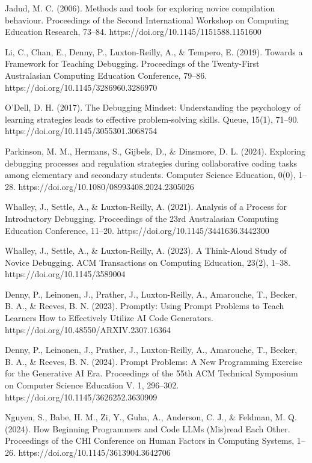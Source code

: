 \documentclass[12pt]{extarticle}
\begin{document}
\newpage
\begin{thebibliography}{9}

Jadud, M. C. (2006). Methods and tools for exploring novice compilation behaviour. Proceedings of the Second International Workshop on Computing Education Research, 73–84. https://doi.org/10.1145/1151588.1151600

Li, C., Chan, E., Denny, P., Luxton-Reilly, A., \& Tempero, E. (2019). Towards a Framework for Teaching Debugging. Proceedings of the Twenty-First Australasian Computing Education Conference, 79–86. https://doi.org/10.1145/3286960.3286970

O’Dell, D. H. (2017). The Debugging Mindset: Understanding the psychology of learning strategies leads to effective problem-solving skills. Queue, 15(1), 71–90. https://doi.org/10.1145/3055301.3068754

Parkinson, M. M., Hermans, S., Gijbels, D., \& Dinsmore, D. L. (2024). Exploring debugging processes and regulation strategies during collaborative coding tasks among elementary and secondary students. Computer Science Education, 0(0), 1–28. https://doi.org/10.1080/08993408.2024.2305026

Whalley, J., Settle, A., \& Luxton-Reilly, A. (2021). Analysis of a Process for Introductory Debugging. Proceedings of the 23rd Australasian Computing Education Conference, 11–20. https://doi.org/10.1145/3441636.3442300

Whalley, J., Settle, A., \& Luxton-Reilly, A. (2023). A Think-Aloud Study of Novice Debugging. ACM Transactions on Computing Education, 23(2), 1–38. https://doi.org/10.1145/3589004

Denny, P., Leinonen, J., Prather, J., Luxton-Reilly, A., Amarouche, T., Becker, B. A., \& Reeves, B. N. (2023). Promptly: Using Prompt Problems to Teach Learners How to Effectively Utilize AI Code Generators. https://doi.org/10.48550/ARXIV.2307.16364

Denny, P., Leinonen, J., Prather, J., Luxton-Reilly, A., Amarouche, T., Becker, B. A., \& Reeves, B. N. (2024). Prompt Problems: A New Programming Exercise for the Generative AI Era. Proceedings of the 55th ACM Technical Symposium on Computer Science Education V. 1, 296–302. https://doi.org/10.1145/3626252.3630909

Nguyen, S., Babe, H. M., Zi, Y., Guha, A., Anderson, C. J., \& Feldman, M. Q. (2024). How Beginning Programmers and Code LLMs (Mis)read Each Other. Proceedings of the CHI Conference on Human Factors in Computing Systems, 1–26. https://doi.org/10.1145/3613904.3642706


\end{thebibliography}
\end{document}
